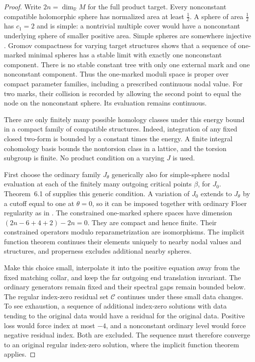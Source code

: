 \documentclass[11pt]{amsart}
\theoremstyle{definition}
\theoremstyle{remark}
\theoremstyle{plain}
\begin{document}
\begin{proof}
Write $2n=\dim_\mathbb R M$ for the full product target.
Every nonconstant compatible holomorphic sphere has
normalized area at least $\frac12$. A sphere of area
$\frac12$ has $c_1=2$ and is simple: a nontrivial
multiple cover would have a nonconstant underlying
sphere of smaller positive area.
Simple spheres are somewhere injective
\cite[Proposition~4.11]{Zinger17}.
Gromov compactness for varying target structures
\cite[Theorem~1.1]{IvashkovichShevchishin99}
shows that a sequence of one-marked minimal spheres has
a stable limit with exactly one nonconstant component.
There is no stable constant tree with only one external
mark and one nonconstant component. Thus the
one-marked moduli space is proper over compact parameter
families, including a prescribed continuous nodal value.
For two marks, their collision is recorded by allowing
the second point to equal the node on the nonconstant
sphere. Its evaluation remains continuous.

There are only finitely many possible homology classes
under this energy bound in a compact family of compatible
structures. Indeed, integration of any fixed closed
two-form is bounded by a constant times the energy.
A finite integral cohomology basis bounds the
nontorsion class in a lattice, and the torsion subgroup
is finite. No product condition on a varying $J$ is used.

First choose the ordinary family $J_\theta$ generically
also for simple-sphere nodal evaluation at each of the
finitely many outgoing critical points $\beta$, for
$J_0$. Theorem~6.1 of \cite{OhZhu09} supplies this
generic condition. A variation of $J_0$ extends to
$J_\theta$ by a cutoff equal to one at $\theta=0$,
so it can be imposed together with ordinary Floer
regularity as in \cite[Lemma~2.35]{DaeFukLip21a}.
The constrained one-marked sphere spaces have dimension
$(2n-6+4+2)-2n=0$. They are compact and hence finite.
Their constrained operators modulo reparametrization
are isomorphisms. The implicit function theorem
continues their elements uniquely to nearby nodal
values and structures, and properness excludes
additional nearby spheres.

Make this choice small, interpolate it into the positive
equation away from the fixed matching collar, and keep
the far outgoing end translation invariant.
The ordinary generators remain fixed and their
spectral gaps remain bounded below. The regular
index-zero residual set $\mathcal C$ continues under
these small data changes. To see exhaustion, a sequence
of additional index-zero solutions with data tending
to the original data would have a residual for the
original data. Positive loss would force index at
most $-4$, and a nonconstant ordinary level would
force negative residual index. Both are excluded.
The sequence must therefore converge to an original
regular index-zero solution, where the implicit
function theorem applies.


\end{proof}
\end{document}
